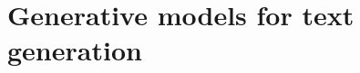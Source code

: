 \chapter{Generative models for text generation}\label{gen}




% 

% 

% 

% 

% 

% 

% 


% 

% 


% 

% 